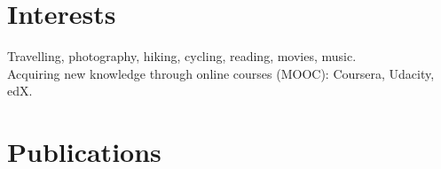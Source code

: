\documentclass[a4paper,10pt]{article} %
\def \vspac {0.25cm}
\begin{document}
\section{Interests}
\vspace{\vspac}
\noindent
Travelling, photography, hiking, cycling, reading, movies, music.  \\
\noindent
Acquiring new knowledge through online courses (MOOC): Coursera, Udacity, edX.

\vspace{\vspac}
\section{Publications}
\noindent
\begingroup
\renewcommand{\section}[2]{}%
\printbibliography[heading=bibintoc]
\endgroup
\end{document}
